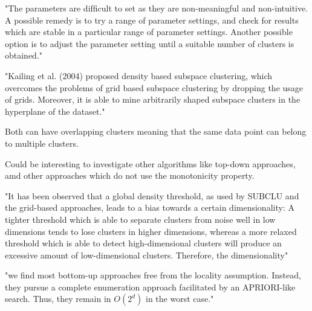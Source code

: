 "The parameters are difﬁcult to set as they are non-meaningful and non-intuitive. A possible remedy is to try a range of parameter settings, and check for results which are stable in a particular range of parameter settings. Another possible option is to adjust the parameter setting until a suitable number of clusters is obtained." \cite{sim-2012}


"Kailing et al. (2004) proposed density based subspace clustering, which overcomes the problems of grid based subspace clustering by dropping the usage of grids. Moreover, it is able to mine arbitrarily shaped subspace clusters in the hyperplane of the dataset." \cite{sim-2012}


Both can have overlapping clusters meaning that the same data point can belong to multiple clusters.

Could be interesting to investigate other algorithms like top-down approaches, amd other approaches which do not use the monotonicity property.


"It has been observed that a global density threshold, as used by SUBCLU and the grid-based approaches, leads to a bias towards a certain dimensionality: A tighter threshold which is able to separate clusters from noise well in low dimensions tends to lose clusters in higher dimensions, whereas a more relaxed threshold which is able to detect high-dimensional clusters will produce an 
excessive amount of low-dimensional clusters. Therefore, the dimensionality" \cite[p.1:16]{kriegel-2009}

"we find most bottom-up approaches free from the locality assumption. Instead, they pursue a complete enumeration approach facilitated by an APRIORI-like search. Thus, they remain in $O(2^d)$ in the worst case." \cite[p.1:41]{kriegel-2009}


